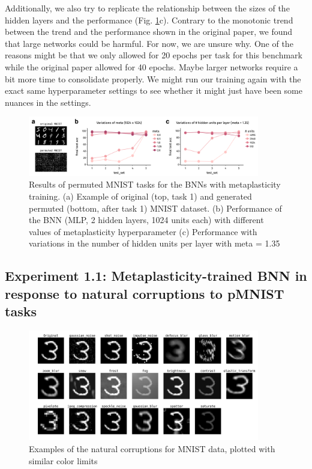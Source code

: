 \documentclass[manuscript,screen,review]{acmart}
\begin{document}
Additionally, we also try to replicate the relationship between the sizes of the hidden layers and the performance (Fig. \ref{fig:fig1}c). Contrary to the monotonic trend between the trend and the performance shown in the original paper, we found that large networks could be harmful. For now, we are unsure why. One of the reasons might be that we only allowed for 20 epochs per task for this benchmark while the original paper allowed for 40 epochs. Maybe larger networks require a bit more time to consolidate properly. We might run our training again with the exact same hyperparameter settings to see whether it might just have been some nuances in the settings. 

\begin{figure}[h]
    \centering
    \includegraphics[width=0.9\textwidth]{figures/report/Fig1.png}
    \caption{Results of permuted MNIST tasks for the BNNs with metaplasticity training. (a) Example of original (top, task 1) and generated permuted (bottom, after task 1) MNIST dataset. (b) Performance of the BNN (MLP, 2 hidden layers, 1024 units each) with different values of metaplasticity hyperparameter (c) Performance with variations in the number of hidden units per layer with meta = 1.35}
    \label{fig:fig1}
\end{figure}

\subsection{Experiment 1.1: Metaplasticity-trained BNN in response to natural corruptions to pMNIST tasks 
}

\begin{figure}[ht]
    \centering
    \includegraphics[width=0.9\textwidth]{figures/report/Fig2.png}
    \caption{Examples of the natural corruptions for MNIST data, plotted with similar color limits}
    \label{fig:fig2}
\end{figure}
\end{document}
